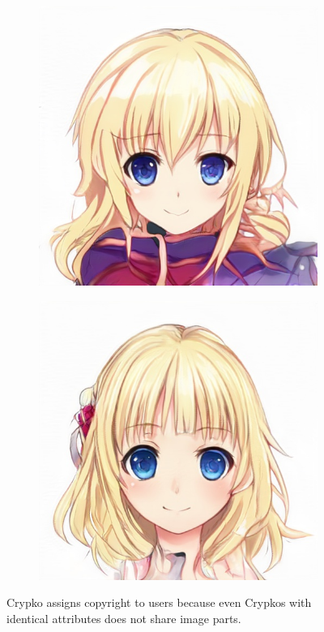 \documentclass[a4paper]{article}
\begin{document}
\begin{figure}[!h]
\begin{subfigure}{0.5\textwidth}
  \includegraphics[width=\textwidth]{578.jpg}
\end{subfigure}\hspace*{\fill}
\begin{subfigure}{0.5\textwidth}
  \includegraphics[width=\textwidth]{280706.jpg}
\end{subfigure}

\caption{
Crypko assigns copyright to users because even Crypkos with identical attributes does not share image parts.
}
\end{figure}
\end{document}
